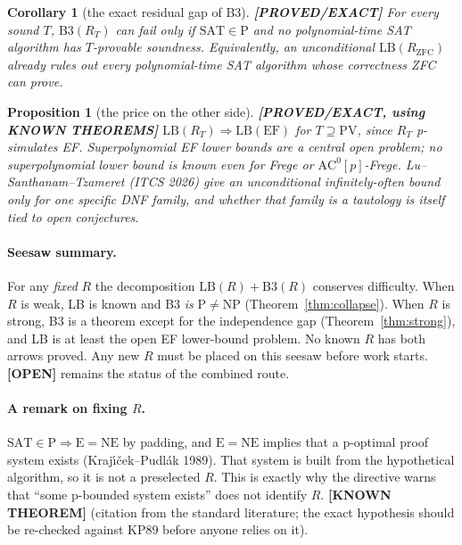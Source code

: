 \documentclass[11pt]{article}
\newtheorem{proposition}[theorem]{Proposition}
\newtheorem{corollary}[theorem]{Corollary}
\theoremstyle{definition}
\theoremstyle{remark}
\newcommand{\SAT}{\mathrm{SAT}}
\newcommand{\status}[1]{\textbf{[#1]}}
\begin{document}
\begin{corollary}[the exact residual gap of B3]
\status{PROVED/EXACT} For every sound $T$, $\mathrm{B3}(R_T)$ can fail only if $\SAT\in\mathrm P$ and
\emph{no} polynomial-time SAT algorithm has $T$-provable soundness. Equivalently, an unconditional
$\mathrm{LB}(R_{\mathrm{ZFC}})$ already rules out every polynomial-time SAT algorithm whose correctness ZFC
can prove.
\end{corollary}

\begin{proposition}[the price on the other side]
\status{PROVED/EXACT, using KNOWN THEOREMS} $\mathrm{LB}(R_T)\Rightarrow\mathrm{LB}(\mathrm{EF})$ for
$T\supseteq\mathrm{PV}$, since $R_T$ p-simulates EF. Superpolynomial EF lower bounds are a central open
problem; no superpolynomial lower bound is known even for Frege or $\mathrm{AC}^0[p]$-Frege. Lu--Santhanam--Tzameret
(ITCS 2026) give an unconditional infinitely-often bound only for one specific DNF family, and whether that
family is a tautology is itself tied to open conjectures.
\end{proposition}

\paragraph{Seesaw summary.} For any \emph{fixed} $R$ the decomposition $\mathrm{LB}(R)+\mathrm{B3}(R)$
conserves difficulty. When $R$ is weak, LB is known and B3 \emph{is} $\mathrm P\ne\mathrm{NP}$ (Theorem~\ref{thm:collapse}).
When $R$ is strong, B3 is a theorem except for the independence gap (Theorem~\ref{thm:strong}), and LB is at
least the open EF lower-bound problem. No known $R$ has both arrows proved. Any new $R$ must be placed on this
seesaw before work starts. \status{OPEN} remains the status of the combined route.

\paragraph{A remark on fixing $R$.} $\SAT\in\mathrm P\Rightarrow\mathrm E=\mathrm{NE}$ by padding, and
$\mathrm E=\mathrm{NE}$ implies that a p-optimal proof system exists (Kraj\'{\i}\v{c}ek--Pudl\'ak 1989). That
system is built from the hypothetical algorithm, so it is not a preselected $R$. This is exactly why the
directive warns that ``some p-bounded system exists'' does not identify $R$. \status{KNOWN THEOREM}
(citation from the standard literature; the exact hypothesis should be re-checked against KP89 before
anyone relies on it).
\end{document}
